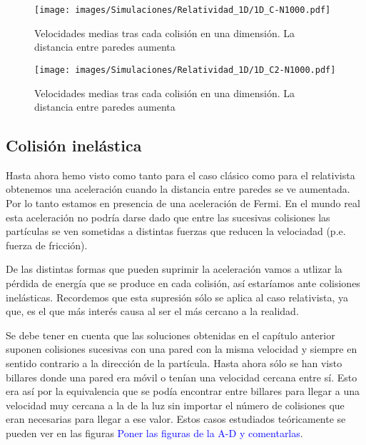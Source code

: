 \documentclass[11pt, spanish]{book}
\begin{document}
\begin{figure}[H]
    \centering
    \texttt{[image: images/Simulaciones/Relatividad\_1D/1D\_C-N1000.pdf]}
    \caption{Velocidades medias tras cada colisión en una dimensión. La distancia entre paredes aumenta}
    \label{fig:relatividad_1D_C}
\end{figure}

\begin{figure}[H]
    \centering
    \texttt{[image: images/Simulaciones/Relatividad\_1D/1D\_C2-N1000.pdf]}
    \caption{Velocidades medias tras cada colisión en una dimensión. La distancia entre paredes aumenta}
    \label{fig:relatividad_1D_C2}
\end{figure}

\subsection{Colisión inelástica}

Hasta ahora hemo visto como tanto para el caso clásico como para el relativista obtenemos una aceleración cuando la distancia entre paredes se ve aumentada. Por lo tanto estamos en presencia de una aceleración de Fermi. En el mundo real esta aceleración no podría darse dado que entre las sucesivas colisiones las partículas se ven sometidas a distintas fuerzas que reducen la velociadad (p.e. fuerza de fricción). 

\vspace{3mm}

De las distintas formas que pueden suprimir la aceleración vamos a utlizar la pérdida de energía que se produce en cada colisión, así estaríamos ante colisiones inelásticas. Recordemos que esta supresión sólo se aplica al caso relativista, ya que, es el que más interés causa al ser el más cercano a la realidad.

\vspace{3mm}

Se debe tener en cuenta que las soluciones obtenidas en el capítulo anterior suponen colisiones sucesivas con una pared con la misma velocidad y siempre en sentido contrario a la dirección de la partícula. Hasta ahora sólo se han visto billares donde una pared era móvil o tenían una velocidad cercana entre sí. Esto era así por la equivalencia que se podía encontrar entre billares para llegar a una velocidad muy cercana a la de la luz sin importar el número de colisiones que eran necesarias para llegar a ese valor. Estos casos estudiados teóricamente se pueden ver en las figuras \textcolor{blue}{Poner las figuras de la A-D y comentarlas}.
\end{document}
